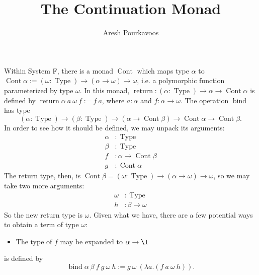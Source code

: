 \documentclass{article}
\DeclareMathOperator{\Cont}{Cont}
\DeclareMathOperator{\return}{return}
\DeclareMathOperator{\bind}{bind}
\DeclareMathOperator{\Type}{Type}
\begin{document}
\title{The Continuation Monad}
\author{Aresh Pourkavoos}
\maketitle

Within System F,
there is a monad $\Cont$
which maps type $\alpha$
to $\Cont\alpha := (\omega : \Type) \rightarrow (\alpha \rightarrow \omega) \rightarrow \omega$,
i.e. a polymorphic function parameterized by type $\omega$.
In this monad, $\return : (\alpha : \Type) \rightarrow \alpha \rightarrow \Cont\alpha$
is defined by $\return \alpha\ a\ \omega\ f := f\ a$,
where $a : \alpha$ and $f : \alpha \rightarrow \omega$.
The operation $\bind$ has type
\[(\alpha : \Type) \rightarrow (\beta : \Type) \rightarrow (\alpha \rightarrow \Cont\beta) \rightarrow \Cont\alpha \rightarrow \Cont\beta.\]
In order to see how it should be defined,
we may unpack its arguments:
\begin{align*}
  \alpha &: \Type \\
  \beta &: \Type \\
  f &: \alpha \rightarrow \Cont \beta \\
  g &: \Cont \alpha
\end{align*}
The return type, then, is $\Cont \beta = (\omega : \Type) \rightarrow (\alpha \rightarrow \omega) \rightarrow \omega$,
so we may take two more arguments:
\begin{align*}
  \omega &: \Type \\
  h &: \beta \rightarrow \omega
\end{align*}
So the new return type is $\omega$.
Given what we have, there are a few potential ways to obtain a term of type $\omega$:
\begin{itemize}
\item
  The type of $f$ may be expanded to
  $\alpha \rightarrow \l$
\end{itemize}

is defined by
\[
\bind \alpha\ \beta\ f\ g\ \omega\ h := g\ \omega\ (\lambda a.(f\ a\ \omega\ h)).
\]


\end{document}
